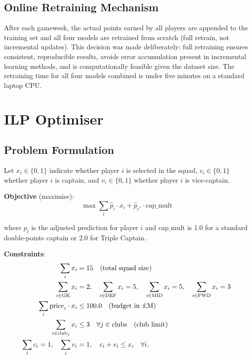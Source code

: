 \subsection{Online Retraining Mechanism}

After each gameweek, the actual points earned by all players are appended to the training set and all four models are retrained from scratch (full retrain, not incremental updates). This decision was made deliberately: full retraining ensures consistent, reproducible results, avoids error accumulation present in incremental learning methods, and is computationally feasible given the dataset size. The retraining time for all four models combined is under five minutes on a standard laptop CPU.

\section{ILP Optimiser}

\subsection{Problem Formulation}

Let $x_i \in \{0, 1\}$ indicate whether player $i$ is selected in the squad, $c_i \in \{0, 1\}$ whether player $i$ is captain, and $v_i \in \{0, 1\}$ whether player $i$ is vice-captain.

\textbf{Objective} (maximise):
\begin{equation}
\max \sum_{i} \hat{p}_i \cdot x_i + \hat{p}_{c^*} \cdot \text{cap\_mult}
\end{equation}

where $\hat{p}_i$ is the adjusted prediction for player $i$ and $\text{cap\_mult}$ is 1.0 for a standard double-points captain or 2.0 for Triple Captain.

\textbf{Constraints}:
\begin{align}
\sum_i x_i &= 15 \quad \text{(total squad size)} \\
\sum_{i \in \text{GK}} x_i &= 2, \quad \sum_{i \in \text{DEF}} x_i = 5, \quad \sum_{i \in \text{MID}} x_i = 5, \quad \sum_{i \in \text{FWD}} x_i = 3 \\
\sum_i \text{price}_i \cdot x_i &\leq 100.0 \quad \text{(budget in \pounds M)} \\
\sum_{i \in \text{club}_j} x_i &\leq 3 \quad \forall j \in \text{clubs} \quad \text{(club limit)} \\
\sum_i c_i = 1, \quad \sum_i v_i &= 1, \quad c_i + v_i \leq x_i \quad \forall i.
\end{align}


